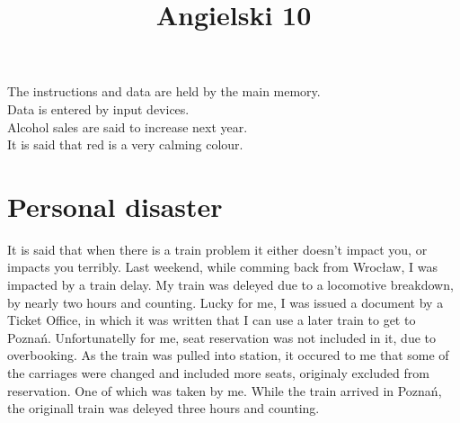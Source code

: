 \documentclass[a4paper,10pt]{article}
\title{Angielski 10}
\author{}
\begin{document}
\maketitle

\begin{abstract}


\end{abstract}
The instructions and data are held by the main memory.\\
Data is entered by input devices. \\
Alcohol sales are said to increase next year. \\
It is said that red is a very calming colour. \\
\section{Personal disaster}
It is said that when there is a train problem it either doesn't impact you, or impacts you terribly. Last weekend, while comming back from Wrocław, I was impacted by a train delay. My train was deleyed due to a locomotive breakdown, by nearly two hours and counting. Lucky for me, I was issued a document by a Ticket Office, in which it was written that I can use a later train to get to Poznań. Unfortunatelly for me, seat reservation was not included in it, due to overbooking. As the train was pulled into station, it occured to me that some of the carriages were changed and included more seats, originaly excluded from reservation. One of which was taken by me. While the train arrived in Poznań, the originall train was deleyed three hours and counting.
\end{document}
